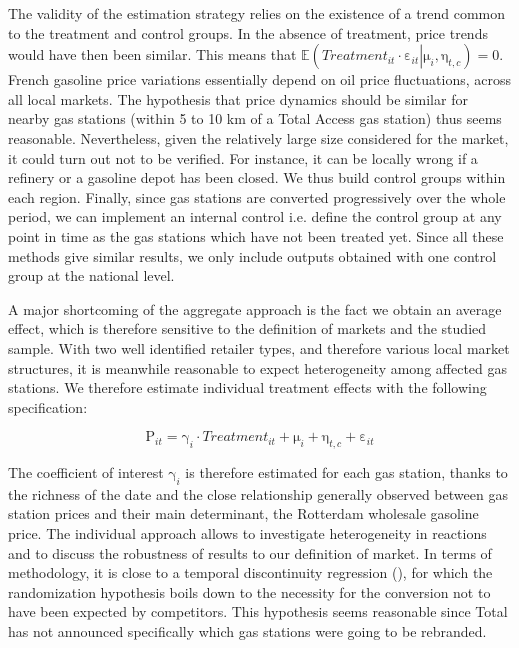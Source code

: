 \documentclass[english]{article}
\begin{document}
The validity of the estimation strategy relies on the existence of a trend common to the treatment and control groups. In the absence of treatment, price trends would have then been similar. This means that
$\mathbb{E}\left(Treatment_{it}\cdot\mathrm{\varepsilon}_{it}\left|\mathrm{\mu}_{i},\mathrm{\eta}_{t,c}\right.\right)=0$. French gasoline price variations essentially depend on oil price fluctuations, across all local markets. The hypothesis that price dynamics should be similar for nearby gas stations (within 5 to 10 km of a Total Access gas station) thus seems reasonable. Nevertheless, given the relatively large size considered for the market, it could turn out not to be verified. For instance, it can be locally wrong if a refinery or a gasoline depot has been closed. We thus build control groups within each region. Finally, since gas stations are converted progressively over the whole period, we can implement an internal control i.e. define the control group at any point in time as the gas stations which have not been treated yet. Since all these methods give similar results, we only include outputs obtained with one control group at the national level.
\medskip{}

A major shortcoming of the aggregate approach is the fact we obtain an average effect, which is therefore sensitive to the definition of markets and the studied sample. With two well identified retailer types, and therefore various local market structures, it is meanwhile reasonable to expect heterogeneity among affected gas stations. We therefore estimate individual treatment effects with the following specification:

\begin{equation}
\mathrm{P}_{it}=\mathrm{\gamma}_{i}\cdot Treatment_{it}+\mathrm{\mu}_{i}+\mathrm{\eta}_{t,c}+\mathrm{\varepsilon}_{it}\label{eq:2}
\end{equation}

The coefficient of interest $\mathrm{\gamma}_{i}$ is therefore estimated for each gas station, thanks to the richness of the date and the close relationship generally observed between gas station prices and their main determinant, the Rotterdam wholesale gasoline price. The individual approach allows to investigate heterogeneity in reactions and to discuss the robustness of results to our definition of market. In terms of methodology, it is close to a temporal discontinuity regression (\cite{AUF11}), for which the randomization hypothesis boils down to the necessity for the conversion not to have been expected by competitors. This hypothesis seems reasonable since Total has not announced specifically which gas stations were going to be rebranded.\medskip{}
\end{document}
